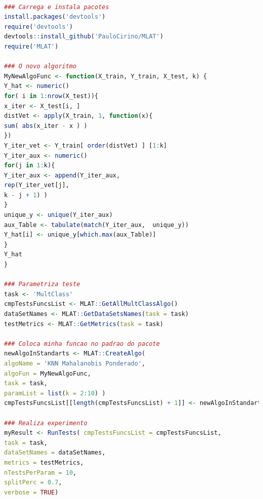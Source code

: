 \begin{lstlisting}[language=R]

### Carrega e instala pacotes
install.packages('devtools')
require('devtools')
devtools::install_github('PauloCirino/MLAT')
require('MLAT')

### O novo algoritmo
MyNewAlgoFunc <- function(X_train, Y_train, X_test, k) {
Y_hat <- numeric()
for( i in 1:nrow(X_test)){
x_iter <- X_test[i, ]
distVet <- apply(X_train, 1, function(x){
sum( abs(x_iter - x ) )
})
Y_iter_vet <- Y_train[ order(distVet) ] [1:k]
Y_iter_aux <- numeric()
for(j in 1:k){
Y_iter_aux <- append(Y_iter_aux,
rep(Y_iter_vet[j],
k - j + 1) )
}
unique_y <- unique(Y_iter_aux)
aux_Table <- tabulate(match(Y_iter_aux,  unique_y))
Y_hat[i] <- unique_y[which.max(aux_Table)]
}
Y_hat
}

### Parametriza teste
task <- 'MultClass'
cmpTestsFuncsList <- MLAT::GetAllMultClassAlgo()
dataSetNames <- MLAT::GetDataSetsNames(task = task)
testMetrics <- MLAT::GetMetrics(task = task)

### Coloca minha funcao no padrao do pacote
newAlgoInStandarts <- MLAT::CreateAlgo(  
algoName = 'KNN Mahalanobis Ponderado', 
algoFun = MyNewAlgoFunc, 
task = task, 
paramList = list(k = 2:10) )
cmpTestsFuncsList[[length(cmpTestsFuncsList) + 1]] <- newAlgoInStandarts

### Realiza experimento
myResult <- RunTests( cmpTestsFuncsList = cmpTestsFuncsList,
task = task,
dataSetNames = dataSetNames,
metrics = testMetrics,
nTestsPerParam = 10,
splitPerc = 0.7, 
verbose = TRUE)

\end{lstlisting}

